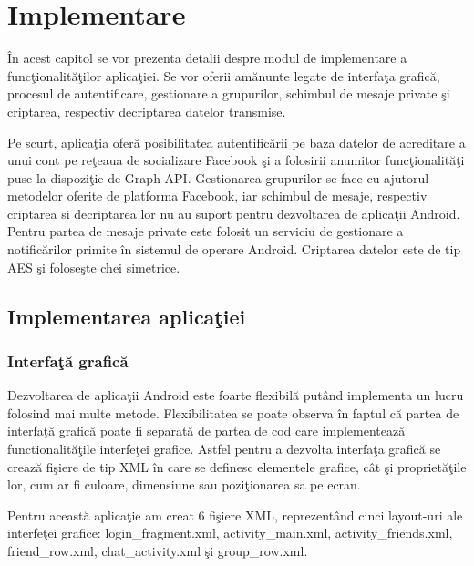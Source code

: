 \chapter{Implementare}

\^{I}n acest capitol se vor prezenta detalii despre modul de implementare a func\c{t}ionalit\u{a}\c{t}ilor aplica\c{t}iei. Se vor oferii am\u{a}nunte legate de interfa\c{t}a grafic\u{a}, procesul de autentificare, gestionare a grupurilor, schimbul de mesaje private \c{s}i criptarea, respectiv decriptarea datelor transmise. 

Pe scurt, aplica\c{t}ia ofer\u{a} posibilitatea autentific\u{a}rii pe baza datelor de acreditare a unui cont pe re\c{t}eaua de socializare Facebook \c{s}i a folosirii anumitor func\c{t}ionalit\u{a}\c{t}i puse la dispozi\c{t}ie de Graph API. Gestionarea grupurilor se face cu ajutorul metodelor oferite de platforma Facebook, iar schimbul de mesaje, respectiv criptarea si decriptarea lor nu au suport pentru dezvoltarea de aplica\c{t}ii Android. Pentru partea de mesaje private este folosit un serviciu de gestionare a notific\u{a}rilor primite \^{i}n sistemul de operare Android. Criptarea datelor este de tip AES \c{s}i folose\c{s}te chei simetrice.  

\section{Implementarea aplica\c{t}iei}
\subsection{Interfa\c{t}\u{a} grafic\u{a}}

Dezvoltarea de aplica\c{t}ii Android este foarte flexibil\u{a} put\^{a}nd implementa un lucru folosind mai multe metode. Flexibilitatea se poate observa \^{i}n faptul c\u{a} partea de interfa\c{t}\u{a} grafic\u{a} poate fi separat\u{a} de partea de cod care implementeaz\u{a} functionalit\u{a}\c{t}ile interfe\c{t}ei grafice. Astfel pentru a dezvolta interfa\c{t}a grafic\u{a} se creaz\u{a} fi\c{s}iere de tip XML \^{i}n care se definesc elementele grafice, c\^{a}t \c{s}i propriet\u{a}\c{t}ile lor, cum ar fi culoare, dimensiune sau pozi\c{t}ionarea sa pe ecran.

	Pentru aceast\u{a} aplica\c{t}ie am creat 6 fi\c{s}iere XML, reprezent\^{a}nd cinci layout-uri ale interfe\c{t}ei grafice: login_fragment.xml, activity_main.xml, activity_friends.xml, friend_row.xml, chat_activity.xml \c{s}i group_row.xml. 
	
